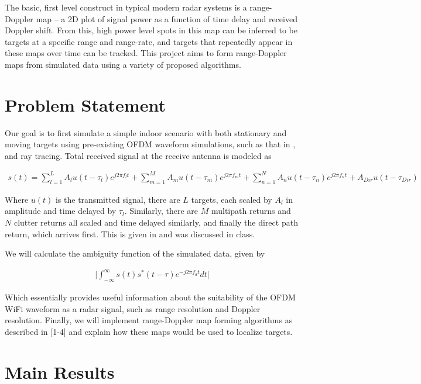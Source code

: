 \documentclass[article,11pt,onecolumn,final]{IEEEtran}
\begin{document}
The basic, first level construct in typical modern radar systems is a range-Doppler map – a 2D plot of
signal power as a function of time delay and received Doppler shift. From this, high power level spots in
this map can be inferred to be targets at a specific range and range-rate, and targets that repeatedly
appear in these maps over time can be tracked. This project aims to form range-Doppler maps from
simulated data using a variety of proposed algorithms.

\section{Problem Statement} 
Our goal is to first simulate a simple indoor scenario with both stationary and moving targets using 
pre-existing OFDM waveform simulations, such as that in \cite{Hemple}, and ray tracing. Total received signal at the receive antenna is modeled as

\begin{align*}
 s(t) = \sum_{l=1}^L A_l u(t-\tau_l)e^{j 2 \pi f_l t} + \sum_{m=1}^M A_m u(t-\tau_m)e^{j 2\pi f_m t} +
        \sum_{n=1}^N A_n u(t-\tau_n)e^{j 2 \pi f_n t} + A_{Dir} u(t-\tau_{Dir})
\end{align*}

Where $u(t)$ is the transmitted signal, there are $L$ targets, each scaled by $A_l$ in amplitude and time
delayed by $\tau_l$. Similarly, there are $M$ multipath returns and $N$ clutter returns all scaled and time delayed similarly, and finally the direct path return, which arrives first. This is given in \cite{Chetty} and was discussed in class.

We will calculate the ambiguity function of the simulated data, given by

\begin{align*}
\big|\int_{-\infty}^{\infty} s(t)s^*(t-\tau)e^{-j2\pi f_d t}dt \big|
\end{align*}

Which essentially provides useful information about the suitability of the OFDM WiFi waveform as a
radar signal, such as range resolution and Doppler resolution. Finally, we will implement range-Doppler
map forming algorithms as described in [1-4] and explain how these maps would be used to localize
targets.


\section{Main Results}
\end{document}
